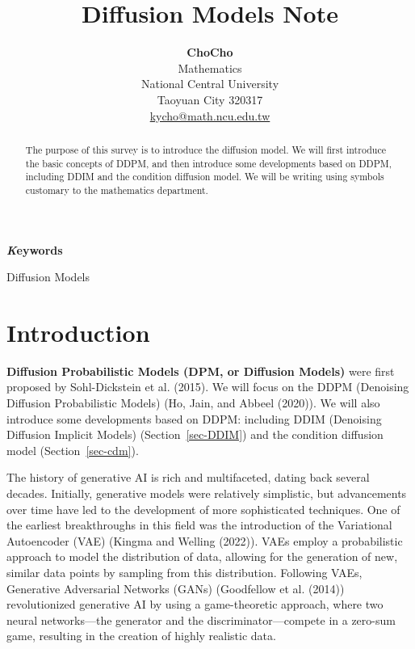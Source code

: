 \documentclass[
]{article}
\title{Diffusion Models Note}
\author{\textbf{ChoCho}\\Mathematics\\National Central
University\\Taoyuan City
320317\\\href{mailto:kycho@math.ncu.edu.tw}{kycho@math.ncu.edu.tw}}
\date{}
\theoremstyle{remark}
\begin{document}
\maketitle
\begin{abstract}
The purpose of this survey is to introduce the diffusion model. We will
first introduce the basic concepts of DDPM, and then introduce some
developments based on DDPM, including DDIM and the condition diffusion
model. We will be writing using symbols customary to the mathematics
department.
\end{abstract}
{\bfseries \emph Keywords}
\def\sep{\textbullet\ }

Diffusion Models


\renewcommand{\Return}{\State \textbf{return}~}
\newcommand{\Print}{\State \textbf{print}~}
\newcommand{\Break}{\State \textbf{break}}
\newcommand{\Continue}{\State \textbf{continue}}
\newcommand{\True}{\textbf{true}}
\newcommand{\False}{\textbf{false}}
\renewcommand{\And}{\textbf{and}~}
\newcommand{\Or}{\textbf{or}~}
\renewcommand{\Not}{\textbf{not}~}
\newcommand{\To}{\textbf{to}~}
\newcommand{\DownTo}{\textbf{downto}~}


\section{Introduction}\label{introduction}

\textbf{Diffusion Probabilistic Models (DPM, or Diffusion Models)} were
first proposed by Sohl-Dickstein et al. (2015). We will focus on the
DDPM (Denoising Diffusion Probabilistic Models) (Ho, Jain, and Abbeel
(2020)). We will also introduce some developments based on DDPM:
including DDIM (Denoising Diffusion Implicit Models)
(Section~\ref{sec-DDIM}) and the condition diffusion model
(Section~\ref{sec-cdm}).

The history of generative AI is rich and multifaceted, dating back
several decades. Initially, generative models were relatively
simplistic, but advancements over time have led to the development of
more sophisticated techniques. One of the earliest breakthroughs in this
field was the introduction of the Variational Autoencoder (VAE) (Kingma
and Welling (2022)). VAEs employ a probabilistic approach to model the
distribution of data, allowing for the generation of new, similar data
points by sampling from this distribution. Following VAEs, Generative
Adversarial Networks (GANs) (Goodfellow et al. (2014)) revolutionized
generative AI by using a game-theoretic approach, where two neural
networks---the generator and the discriminator---compete in a zero-sum
game, resulting in the creation of highly realistic data.
\end{document}
